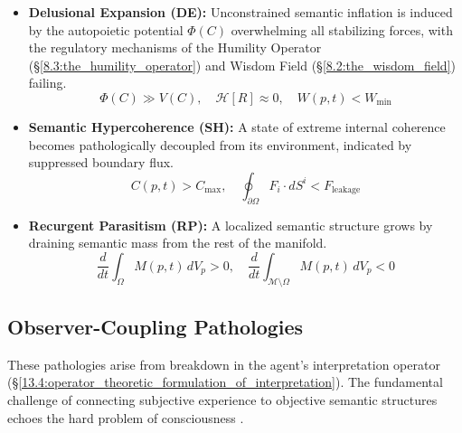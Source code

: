 \begin{itemize}

    \item \textbf{Delusional Expansion (DE):} Unconstrained semantic inflation is induced by the autopoietic potential \(\Phi(C)\) overwhelming all stabilizing forces, with the regulatory mechanisms of the Humility Operator (\S\ref{8.3:the_humility_operator}) and Wisdom Field (\S\ref{8.2:the_wisdom_field}) failing.
    \begin{equation}
    \Phi(C) \gg V(C), \quad \mathcal{H}[R] \approx 0, \quad W(p,t) < W_{\text{min}}
    \end{equation}

    \item \textbf{Semantic Hypercoherence (SH):} A state of extreme internal coherence becomes pathologically decoupled from its environment, indicated by suppressed boundary flux.
    \begin{equation}
    C(p,t) > C_{\text{max}}, \quad \oint_{\partial \Omega} F_i \cdot dS^i < F_{\text{leakage}}
    \end{equation}

    \item \textbf{Recurgent Parasitism (RP):} A localized semantic structure grows by draining semantic mass from the rest of the manifold.
    \begin{equation}
    \frac{d}{dt}\int_{\Omega} M(p,t) \, dV_p > 0, \quad \frac{d}{dt}\int_{\mathcal{M}\setminus\Omega} M(p,t) \, dV_p < 0
    \end{equation}

\end{itemize}


\subsection{Observer-Coupling Pathologies}
\label{16.1.4:observer_coupling_pathologies}

These pathologies arise from breakdown in the agent's interpretation operator (\S\ref{13.4:operator_theoretic_formulation_of_interpretation}). The fundamental challenge of connecting subjective experience to objective semantic structures echoes the hard problem of consciousness \autocite{Chalmers1996}.

